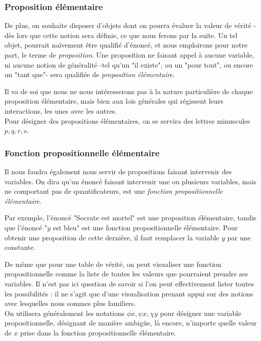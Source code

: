 \documentclass{article}
\begin{document}
\subsubsection{Proposition élémentaire}

De plus, on souhaite disposer d'objets dont on pourra évaluer la valeur de vérité - dès lors que cette notion sera définie, ce que nous ferons par la suite. Un tel objet, pourrait naïvement être qualifié d'énoncé, et nous emploirons pour notre part, le terme de \textit{proposition}. Une proposition ne faisant appel à aucune variable, ni aucune notion de généralité -tel qu'un "il existe", ou un "pour tout", ou encore un "tant que"- sera qualifiée de \textit{proposition élémentaire}.

Il va de soi que nous ne nous intéresserons pas à la nature particulière de chaque proposition élémentaire, mais bien aux lois générales qui régissent leurs interactions, les unes avec les autres.
\\

Pour désigner des propositions élémentaires, on se servira des lettres minuscules $p,q,r,s$.
\\

\subsubsection{Fonction propositionnelle élémentaire}

Il nous faudra également nous servir de propositions faisant intervenir des variables. On dira qu'un énoncé faisant intervenir une ou plusieurs variables, mais ne comportant pas de quantificateurs, est une \textit{fonction propositionnelle élémentaire}.

Par exemple, l'énoncé "Socrate est mortel" est une proposition élémentaire, tandis que l'énoncé "$y$ est bleu" est une fonction propositionnelle élémentaire. Pour obtenir une proposition de cette dernière, il faut remplacer la variable $y$ par une constante.

De même que pour une table de vérité, on peut visualiser une fonction propositionnelle comme la liste de toutes les valeurs que pourraient prendre ses variables. 
Il n'est pas ici question de savoir si l'on peut effectivement lister toutes les possibilités : il ne s'agit que d'une visualisation prenant appui sur des notions avec lesquelles nous sommes plus familiers.
\\

On utilisera généralement les notations $\phi x,\psi  x, \chi y$ pour désigner une variable propositionnelle, désignant de manière ambigüe, là encore, n'importe quelle valeur de $x$ prise dans la fonction propositionnelle élémentaire. 
\end{document}
